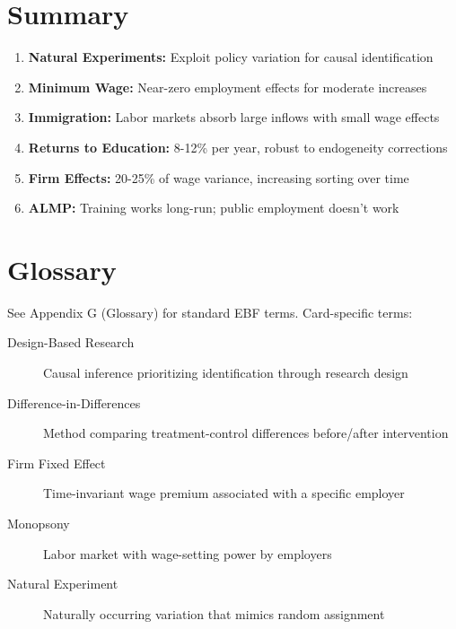 \section{Summary}

\begin{tcolorbox}[colback=gray!10!white, colframe=gray!75!black, title=Key Takeaways]
\begin{enumerate}
    \item \textbf{Natural Experiments:} Exploit policy variation for causal identification
    \item \textbf{Minimum Wage:} Near-zero employment effects for moderate increases
    \item \textbf{Immigration:} Labor markets absorb large inflows with small wage effects
    \item \textbf{Returns to Education:} 8-12\% per year, robust to endogeneity corrections
    \item \textbf{Firm Effects:} 20-25\% of wage variance, increasing sorting over time
    \item \textbf{ALMP:} Training works long-run; public employment doesn't work
\end{enumerate}
\end{tcolorbox}

\section{Glossary}

See Appendix G (Glossary) for standard EBF terms. Card-specific terms:

\begin{description}
    \item[Design-Based Research] Causal inference prioritizing identification through research design
    \item[Difference-in-Differences] Method comparing treatment-control differences before/after intervention
    \item[Firm Fixed Effect] Time-invariant wage premium associated with a specific employer
    \item[Monopsony] Labor market with wage-setting power by employers
    \item[Natural Experiment] Naturally occurring variation that mimics random assignment
\end{description}

